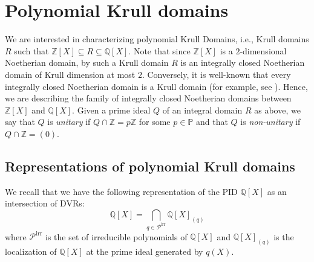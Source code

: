 \documentclass[10pt]{article}
\numberwithin{equation}{section}
\theoremstyle{definition}
\theoremstyle{definition}
\newcommand{\Q}{\mathbb{Q}}
\newcommand{\Z}{\mathbb{Z}}
\newcommand{\PP}{\mathbb{P}}
\begin{document}
\vskip1cm

\section{Polynomial Krull domains }

We are interested in characterizing polynomial Krull Domains, i.e., Krull domains $R$ such that $\Z[X]\subseteq R\subseteq\Q[X]$.
Note that since $\Z[X]$ is a $2$-dimensional Noetherian domain, by \cite[Theorem 9]{Heinzer} such a Krull domain $R$ is an integrally closed Noetherian domain of Krull dimension at most $2$. Conversely,
it is well-known that every integrally closed Noetherian domain is a Krull domain (for example, see \cite[Chapter VI, \S 13, (b), p. 82]{ZS2}). Hence, we are describing the family of integrally closed Noetherian domains between $\Z[X]$ and $\Q[X]$. Given a prime ideal $Q$ of an integral domain $R$ as above, we say that $Q$ is \emph{unitary} if $Q\cap\Z=p\Z$ for some $p\in\PP$ and that $Q$ is \emph{non-unitary} if $Q\cap\Z=(0)$.

\subsection{Representations of polynomial Krull domains} 


We recall that we have the following representation of the PID $\Q[X]$ as an intersection of DVRs:
$$\Q[X]=\bigcap_{q\in\mathcal{P}^{\text{irr}}}\Q[X]_{(q)}$$
where $\mathcal{P}^{\text{irr}}$ is the set of irreducible polynomials of $\Q[X]$  and $\Q[X]_{(q)}$ is the localization of $\Q[X]$ at the prime ideal generated by $q(X)$.
\end{document}
